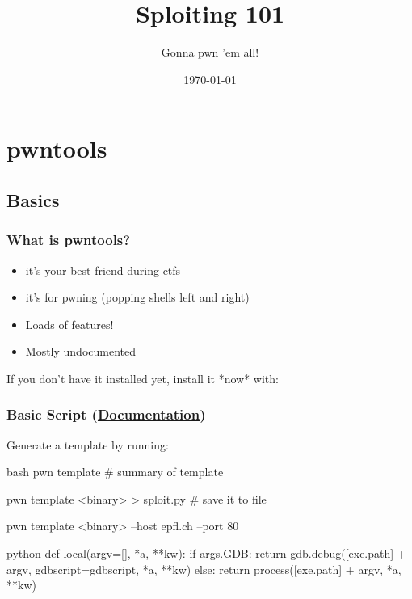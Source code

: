 \documentclass[aspectratio=169]{beamer}
\title{Sploiting 101}
\subtitle{Gonna pwn 'em all!}
\date{\today}
\newcommand{\docl}[1]{(\textbf{\href{#1}{Documentation}})}
\begin{document}
\titleframe



{
\hidesectionframe
\showsubsectionframe

\section{pwntools}
\subsection{Basics}
\begin{frame}[fragile]
    \frametitle{What is pwntools?}
    \begin{itemize}
        \item it's your best friend during ctfs
        \item it's for pwning (popping shells left and right)
		\item Loads of features!
		\item Mostly undocumented
	\end{itemize}
	\vspace{1em}
	If you don't have it installed yet, install it *now* with:\\
\end{frame}

\begin{frame}[fragile]
    \frametitle{Basic Script \docl{http://docs.pwntools.com/en/stable/commandline.html\#pwn-template}}
    Generate a template by running: 
    \begin{codebox}{bash}
pwn template # summary of template

pwn template <binary> > sploit.py # save it to file

pwn template <binary> --host epfl.ch --port 80\end{codebox}

\end{frame}
\begin{frame}[fragile]

    \begin{codebox}{python}
def local(argv=[], *a, **kw):
    if args.GDB:
        return gdb.debug([exe.path] + argv, gdbscript=gdbscript, *a, **kw)
    else:
        return process([exe.path] + argv, *a, **kw)


\end{codebox}
\end{frame}}
\end{document}
